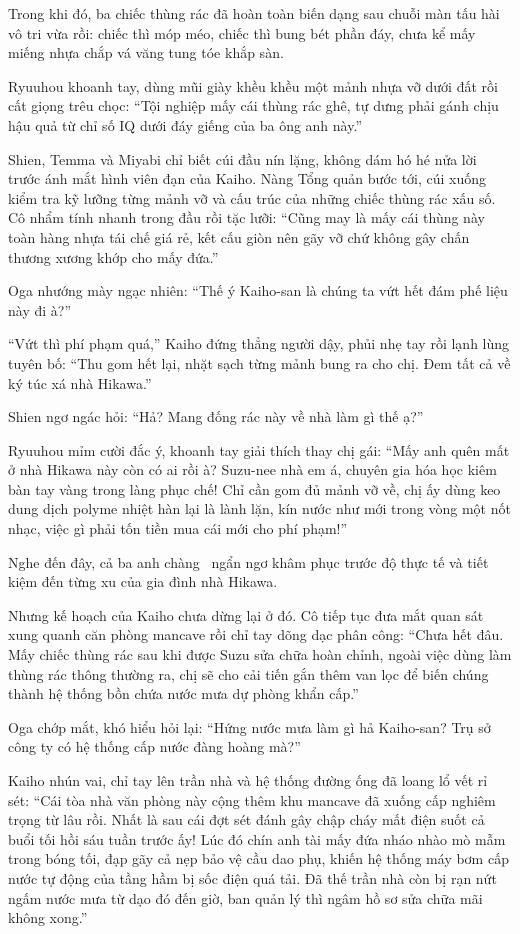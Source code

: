 \documentclass[../main.tex]{subfiles}
\begin{document}
Trong khi đó, ba chiếc thùng rác đã hoàn toàn biến dạng sau chuỗi màn tấu hài vô tri vừa rồi: chiếc thì móp méo, chiếc thì bung bét phần đáy, chưa kể mấy miếng nhựa chắp vá văng tung tóe khắp sàn.

Ryuuhou khoanh tay, dùng mũi giày khều khều một mảnh nhựa vỡ dưới đất rồi cất giọng trêu chọc: ``Tội nghiệp mấy cái thùng rác ghê, tự dưng phải gánh chịu hậu quả từ chỉ số IQ dưới đáy giếng của ba ông anh này.''

Shien, Temma và Miyabi chỉ biết cúi đầu nín lặng, không dám hó hé nửa lời trước ánh mắt hình viên đạn của Kaiho. Nàng Tổng quản bước tới, cúi xuống kiểm tra kỹ lưỡng từng mảnh vỡ và cấu trúc của những chiếc thùng rác xấu số. Cô nhẩm tính nhanh trong đầu rồi tặc lưỡi: ``Cũng may là mấy cái thùng này toàn hàng nhựa tái chế giá rẻ, kết cấu giòn nên gãy vỡ chứ không gây chấn thương xương khớp cho mấy đứa.''

Oga nhướng mày ngạc nhiên: ``Thế ý Kaiho-san là chúng ta vứt hết đám phế liệu này đi à?''

``Vứt thì phí phạm quá,'' Kaiho đứng thẳng người dậy, phủi nhẹ tay rồi lạnh lùng tuyên bố: ``Thu gom hết lại, nhặt sạch từng mảnh bung ra cho chị. Đem tất cả về ký túc xá nhà Hikawa.''

Shien ngơ ngác hỏi: ``Hả? Mang đống rác này về nhà làm gì thế ạ?''

Ryuuhou mỉm cười đắc ý, khoanh tay giải thích thay chị gái: ``Mấy anh quên mất ở nhà Hikawa này còn có ai rồi à? Suzu-nee nhà em á, chuyên gia hóa học kiêm bàn tay vàng trong làng phục chế! Chỉ cần gom đủ mảnh vỡ về, chị ấy dùng keo dung dịch polyme nhiệt hàn lại là lành lặn, kín nước như mới trong vòng một nốt nhạc, việc gì phải tốn tiền mua cái mới cho phí phạm!''

Nghe đến đây, cả ba anh chàng \hls\ ngẩn ngơ khâm phục trước độ thực tế và tiết kiệm đến từng xu của gia đình nhà Hikawa.

Nhưng kế hoạch của Kaiho chưa dừng lại ở đó. Cô tiếp tục đưa mắt quan sát xung quanh căn phòng mancave rồi chỉ tay dõng dạc phân công: ``Chưa hết đâu. Mấy chiếc thùng rác sau khi được Suzu sửa chữa hoàn chỉnh, ngoài việc dùng làm thùng rác thông thường ra, chị sẽ cho cải tiến gắn thêm van lọc để biến chúng thành hệ thống bồn chứa nước mưa dự phòng khẩn cấp.''

Oga chớp mắt, khó hiểu hỏi lại: ``Hứng nước mưa làm gì hả Kaiho-san? Trụ sở công ty có hệ thống cấp nước đàng hoàng mà?''

Kaiho nhún vai, chỉ tay lên trần nhà và hệ thống đường ống đã loang lổ vết rỉ sét: ``Cái tòa nhà văn phòng này cộng thêm khu mancave đã xuống cấp nghiêm trọng từ lâu rồi. Nhất là sau cái đợt sét đánh gây chập cháy mất điện suốt cả buổi tối hồi sáu tuần trước ấy! Lúc đó chín anh tài mấy đứa nháo nhào mò mẫm trong bóng tối, đạp gãy cả nẹp bảo vệ cầu dao phụ, khiến hệ thống máy bơm cấp nước tự động của tầng hầm bị sốc điện quá tải. Đã thế trần nhà còn bị rạn nứt ngấm nước mưa từ dạo đó đến giờ, ban quản lý thì ngâm hồ sơ sửa chữa mãi không xong.''
\end{document}

